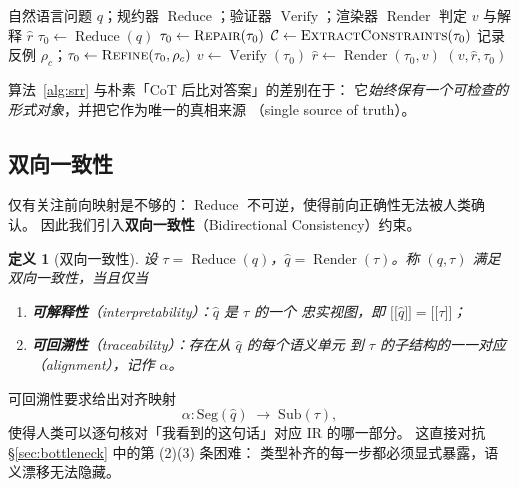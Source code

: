 \documentclass[UTF8,a4paper,11pt]{ctexart}
\newtheorem{definition}{定义}[section]
\providecommand{\llbracket}{\mathopen{[\![}}
\providecommand{\rrbracket}{\mathclose{]\!]}}
\newcommand{\sem}[1]{\llbracket #1 \rrbracket}
\DeclareMathOperator{\Verify}{Verify}
\DeclareMathOperator{\Reduce}{Reduce}
\DeclareMathOperator{\Render}{Render}
\begin{document}
\begin{algorithm}[htbp]
\caption{语义规约驱动的可靠推理（SRR: Semantic-Reduction Reasoning）}
\label{alg:srr}
\begin{algorithmic}[1]
\Require 自然语言问题 $q$；规约器 $\Reduce$；验证器 $\Verify$；渲染器 $\Render$
\Ensure 判定 $v$ 与解释 $\hat{r}$
\State $\tau_0 \gets \Reduce(q)$ 
    \State $\tau_0 \gets \textsc{Repair}(\tau_0)$ 
\EndIf
\State $\mathcal{C} \gets \textsc{ExtractConstraints}(\tau_0)$
 
        \State 记录反例 $\rho_c$；$\tau_0 \gets \textsc{Refine}(\tau_0, \rho_c)$
    \EndIf
\EndFor
\State $v \gets \Verify(\tau_0)$ 
\State $\hat{r} \gets \Render(\tau_0, v)$ 
\State \Return $(v, \hat{r}, \tau_0)$ 
\end{algorithmic}
\end{algorithm}

算法~\ref{alg:srr} 与朴素「CoT 后比对答案」的差别在于：
它\emph{始终保有一个可检查的形式对象}，并把它作为唯一的真相来源
（single source of truth）。

\subsection{双向一致性}

仅有关注前向映射是不够的：$\Reduce$ 不可逆，使得前向正确性无法被人类确认。
因此我们引入\textbf{双向一致性}（Bidirectional Consistency）约束。

\begin{definition}[双向一致性]\label{def:biconsistency}
设 $\tau = \Reduce(q)$，$\hat{q} = \Render(\tau)$。称 $(q, \tau)$ 满足
双向一致性，当且仅当
\begin{enumerate}[leftmargin=1.8em,itemsep=2pt]
  \item \textbf{可解释性}（interpretability）：$\hat{q}$ 是 $\tau$ 的一个
        忠实视图，即 $\sem{\hat{q}} = \sem{\tau}$；
  \item \textbf{可回溯性}（traceability）：存在从 $\hat{q}$ 的每个语义单元
        到 $\tau$ 的子结构的一一对应（alignment），记作 $\alpha$。
\end{enumerate}
\end{definition}

可回溯性要求给出对齐映射
\begin{equation}\label{eq:align}
  \alpha : \mathrm{Seg}(\hat{q}) \;\longrightarrow\; \mathrm{Sub}(\tau),
\end{equation}
使得人类可以逐句核对「我看到的这句话」对应 IR 的哪一部分。
这直接对抗 \S\ref{sec:bottleneck} 中的第 (2)(3) 条困难：
类型补齐的每一步都必须显式暴露，语义漂移无法隐藏。
\end{document}
